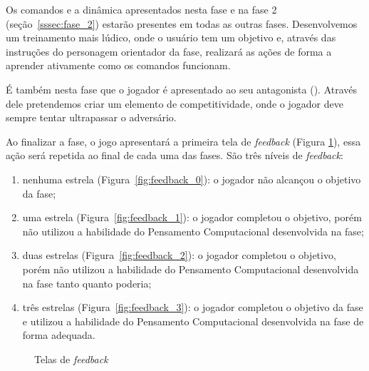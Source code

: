 

Os comandos e a dinâmica apresentados nesta fase e na fase 2 (seção~\ref{sssec:fase_2}) estarão presentes em todas as outras fases. Desenvolvemos um treinamento mais lúdico, onde o usuário tem um objetivo e, através das instruções do personagem orientador da fase, realizará as ações de forma a aprender ativamente como os comandos funcionam.

É também nesta fase que o jogador é apresentado ao seu antagonista (). Através dele pretendemos criar um elemento de competitividade, onde o jogador deve sempre tentar ultrapassar o adversário.


Ao finalizar a fase, o jogo apresentará a primeira tela de \textit{feedback} (Figura \ref{fig:feedbacks}), essa ação será repetida ao final de cada uma das fases. São três níveis de \textit{feedback}: 

\begin{enumerate}
	\item nenhuma estrela (Figura~\ref{fig:feedback_0}): o jogador não alcançou o objetivo da fase;
	\item uma estrela (Figura~\ref{fig:feedback_1}): o jogador completou o objetivo, porém não utilizou a habilidade do Pensamento Computacional desenvolvida na fase;
	\item duas estrelas (Figura~\ref{fig:feedback_2}): o jogador completou o objetivo, porém não utilizou a habilidade do Pensamento Computacional desenvolvida na fase tanto quanto poderia;
	\item três estrelas (Figura~\ref{fig:feedback_3}): o jogador completou o objetivo da fase e utilizou a habilidade do Pensamento Computacional desenvolvida na fase de forma adequada.
\end{enumerate}

\begin{figure}[H]
\centering
{}
\quad %
\quad %
\quad %
\caption{Telas de \textit{feedback}}
\label{fig:feedbacks}
\end{figure}

